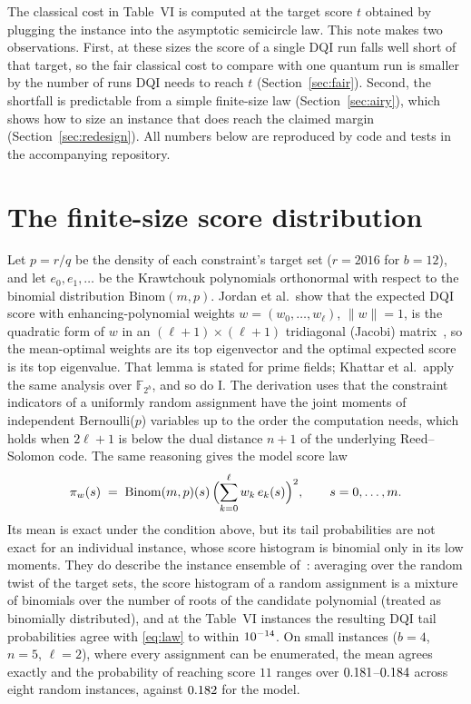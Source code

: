 \documentclass[11pt]{article}
\newcommand{\Binom}{\mathrm{Binom}}
\begin{document}
The classical cost in Table~VI is computed at the target score $t$ obtained by plugging the instance into the asymptotic semicircle law.
This note makes two observations.
First, at these sizes the score of a single DQI run falls well short of that target, so the fair classical cost to compare with one quantum run is smaller by the number of runs DQI needs to reach $t$ (Section~\ref{sec:fair}).
Second, the shortfall is predictable from a simple finite-size law (Section~\ref{sec:airy}), which shows how to size an instance that does reach the claimed margin (Section~\ref{sec:redesign}).
All numbers below are reproduced by code and tests in the accompanying repository.

\section{The finite-size score distribution}\label{sec:exact}

Let $p=r/q$ be the density of each constraint's target set ($r=2016$ for $b=12$), and let $e_0,e_1,\dots$ be the Krawtchouk polynomials orthonormal with respect to the binomial distribution $\Binom(m,p)$.
Jordan et al.\ show that the expected DQI score with enhancing-polynomial weights $w=(w_0,\dots,w_\ell)$, $\|w\|=1$, is the quadratic form of $w$ in an $(\ell+1)\times(\ell+1)$ tridiagonal (Jacobi) matrix~\cite[Lemma~9.2 of the arXiv version]{jordan2025dqi}, so the mean-optimal weights are its top eigenvector and the optimal expected score is its top eigenvalue.
That lemma is stated for prime fields; Khattar et al.\ apply the same analysis over $\mathbb{F}_{2^b}$, and so do I.
The derivation uses that the constraint indicators of a uniformly random assignment have the joint moments of independent Bernoulli($p$) variables up to the order the computation needs, which holds when $2\ell+1$ is below the dual distance $n+1$ of the underlying Reed--Solomon code.
The same reasoning gives the model score law
\begin{equation}\label{eq:law}
  \pi_w(s) \;=\; \Binom(m,p)(s)\,\Bigl(\sum_{k=0}^{\ell} w_k\, e_k(s)\Bigr)^{2}, \qquad s=0,\dots,m.
\end{equation}
Its mean is exact under the condition above, but its tail probabilities are not exact for an individual instance, whose score histogram is binomial only in its low moments.
They do describe the instance ensemble of~\cite{khattar2025verifiable}: averaging over the random twist of the target sets, the score histogram of a random assignment is a mixture of binomials over the number of roots of the candidate polynomial (treated as binomially distributed), and at the Table~VI instances the resulting DQI tail probabilities agree with \eqref{eq:law} to within $10^{-14}$.
On small instances ($b=4$, $n=5$, $\ell=2$), where every assignment can be enumerated, the mean agrees exactly and the probability of reaching score $11$ ranges over $0.181$--$0.184$ across eight random instances, against $0.182$ for the model.
\end{document}
